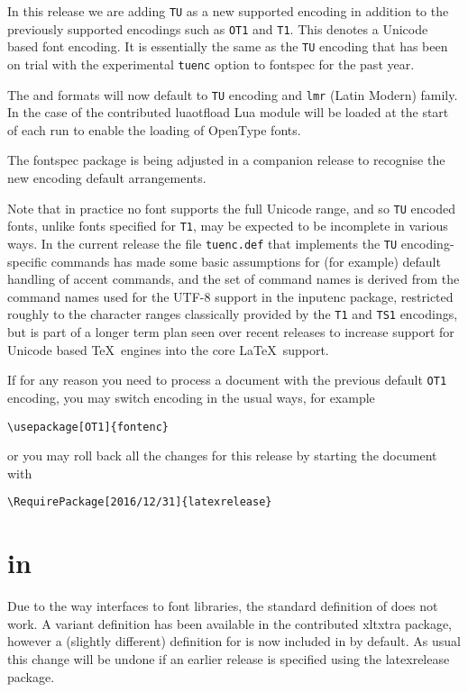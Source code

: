 \documentclass{ltnews}
\begin{document}
In this release we are adding \texttt{TU} as a new supported
encoding in addition to the previously supported encodings such as \texttt{OT1}
and \texttt{T1}. This denotes a Unicode based font encoding. It is essentially
the same as the \texttt{TU} encoding that has been on trial with the
experimental \texttt{tuenc} option to \textsf{fontspec} for the past
year.

The  and  formats will now default
to \texttt{TU} encoding and \texttt{lmr} (Latin Modern) family. In the
case of  the contributed \textsf{luaotfload} Lua
module will be loaded at the start of each run to enable the loading
of OpenType fonts.

The \textsf{fontspec} package is being adjusted in a companion release
to recognise the new encoding default arrangements.

Note that in practice no font supports the full Unicode range, and so
\texttt{TU} encoded fonts, unlike fonts specified for \texttt{T1}, may be
expected to be incomplete in various ways. In the current release the file
\texttt{tuenc.def} that implements the \texttt{TU} encoding-specific commands
has made some basic assumptions for (for example) default handling of
accent commands, and the set of command names is derived from the
command names used for the UTF-8 support in the \textsf{inputenc} package,
restricted roughly to the character ranges classically provided by
the \texttt{T1} and \texttt{TS1} encodings, but is part of a longer term plan
seen over recent releases to increase support for Unicode based \TeX\ engines
into the core \LaTeX\ support.



If for any reason you need to process a document with the previous
default \texttt{OT1} encoding, you may switch encoding in the usual ways, for
example
\begin{verbatim}
\usepackage[OT1]{fontenc}
\end{verbatim}
or you may roll back all the changes for this release by starting the
document with
\begin{verbatim}
\RequirePackage[2016/12/31]{latexrelease}
\end{verbatim}

\section{ in }
Due to the way  interfaces to font libraries, the
standard definition of  does not work.  A variant
definition has been available in the contributed \textsf{xltxtra}
package, however a (slightly different) definition for 
is now included in  by default. As usual
this change will be undone if an earlier
release is specified using the \textsf{latexrelease} package.
\end{document}
